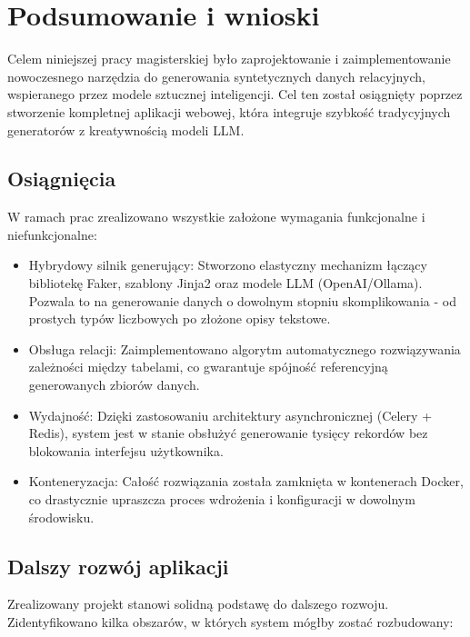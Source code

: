 \chapter{Podsumowanie i wnioski}
\label{cha:summary}

Celem niniejszej pracy magisterskiej było zaprojektowanie i zaimplementowanie nowoczesnego narzędzia do generowania syntetycznych danych relacyjnych, wspieranego przez modele sztucznej inteligencji. Cel ten został osiągnięty poprzez stworzenie kompletnej aplikacji webowej, która integruje szybkość tradycyjnych generatorów z kreatywnością modeli \gls{LLM}.

\section{Osiągnięcia}
W ramach prac zrealizowano wszystkie założone wymagania funkcjonalne i niefunkcjonalne:
\begin{itemize}
    \item Hybrydowy silnik generujący: Stworzono elastyczny mechanizm łączący bibliotekę Faker, szablony Jinja2 oraz modele \gls{LLM} (OpenAI/Ollama). Pozwala to na generowanie danych o dowolnym stopniu skomplikowania - od prostych typów liczbowych po złożone opisy tekstowe.
    \item Obsługa relacji: Zaimplementowano algorytm automatycznego rozwiązywania zależności między tabelami, co gwarantuje spójność referencyjną generowanych zbiorów danych.
    \item Wydajność: Dzięki zastosowaniu architektury asynchronicznej (Celery + Redis), system jest w stanie obsłużyć generowanie tysięcy rekordów bez blokowania interfejsu użytkownika.
    \item Konteneryzacja: Całość rozwiązania została zamknięta w kontenerach Docker, co drastycznie upraszcza proces wdrożenia i konfiguracji w dowolnym środowisku.
\end{itemize}

\section{Dalszy rozwój aplikacji}
Zrealizowany projekt stanowi solidną podstawę do dalszego rozwoju. Zidentyfikowano kilka obszarów, w których system mógłby zostać rozbudowany:

